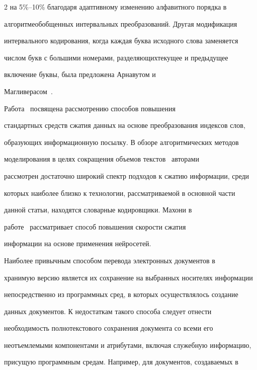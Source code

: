 \begin{multicols}{2}
на 5\%--10\% благодаря адаптивному изменению алфавитного порядка в 


алгоритме\linebreak обобщенных интервальных преобразований. Другая модификация 


интервального кодирования, когда каждая буква исходного слова заменяется 


чис\-лом букв с большими номерами, разделяющих\linebreak текущее и предыдущее 


включение буквы, была предложена Арнавутом и 


Магливерасом~\cite{17che}.


     


     Работа~\cite{18che} посвящена рассмотрению способов повышения 


стандартных средств сжатия данных на основе преобразования индексов слов, 


образующих информационную посылку. В обзоре алгоритмических методов 


моделирования в целях сокращения объемов текстов~\cite{19che} авторами 


рассмотрен достаточно широкий спектр подходов к сжатию информации, среди 


которых наиболее близко к технологии, рассматриваемой в основной части 


данной статьи, находятся словарные кодировщики. Махони в 


работе~\cite{20che} рассматривает способ повышения скорости сжатия 


информации на основе применения нейросетей. 


     


     Наиболее привычным способом перевода электронных документов в 


хранимую версию является их сохранение на выбранных носителях информации 


непосредственно из программных сред, в которых осуществлялось создание 


данных документов. К недостаткам такого способа следует отнести 


необходимость полнотекстового сохранения документа со всеми его 


неотъемлемыми компонентами и атрибутами, включая служебную информацию, 


присущую программным средам. Например, для документов, создаваемых в 



\end{multicols}
